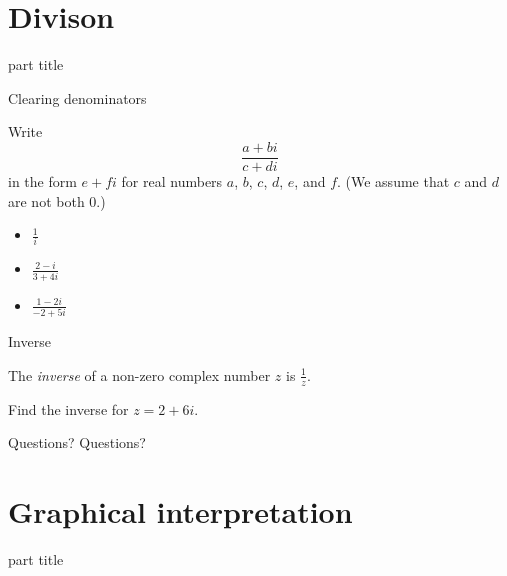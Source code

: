 \documentclass{beamer}
\begin{document}
\section{Divison}

\begin{frame}
\begin{beamercolorbox}[sep=12pt,center]{part title}
\insertsection\par
\end{beamercolorbox}
\end{frame}

\begin{frame}{Clearing denominators}
\begin{example}
Write 
\begin{equation*}
\frac{a+bi}{c+di}
\end{equation*}
in the form $e+fi$ for real numbers $a$, $b$, $c$, $d$, $e$, and $f$.
(We assume that $c$ and $d$ are not both $0$.)
\end{example}
\begin{example}
\begin{itemize}
\item $\frac{1}{i}$ %
\item $\frac{2-i}{3+4i}$ %
\item $\frac{1-2i}{-2+5i}$ %
\end{itemize}
\end{example}
\end{frame}

\begin{frame}{Inverse}
\begin{definition}
The \emph{inverse} of a non-zero complex number $z$ is $\frac{1}{z}$.
\end{definition}
\begin{example}
Find the inverse for $z = 2+6i$.
\end{example}
\end{frame}

\begin{frame}{Questions?}
Questions?
\end{frame}


\section{Graphical interpretation}

\begin{frame}
\begin{beamercolorbox}[sep=12pt,center]{part title}
\insertsection\par
\end{beamercolorbox}
\end{frame}
\end{document}
